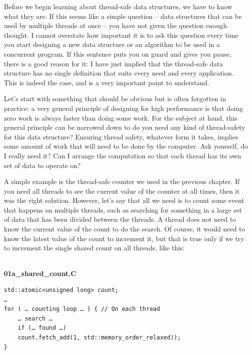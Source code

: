 
Before we begin learning about thread-safe data structures, we have to know what they are. If this seems like a simple question – data structures that can be used by multiple threads at once – you have not given the question enough thought. I cannot overstate how important it is to ask this question every time you start designing a new data structure or an algorithm to be used in a concurrent program. If this sentence puts you on guard and gives you pause, there is a good reason for it: I have just implied that the thread-safe data structure has no single definition that suits every need and every application. This is indeed the case, and is a very important point to understand.


Let's start with something that should be obvious but is often forgotten in practice: a very general principle of designing for high performance is that doing zero work is always faster than doing some work. For the subject at hand, this general principle can be narrowed down to do you need any kind of thread-safety for this data structure? Ensuring thread safety, whatever form it takes, implies some amount of work that will need to be done by the computer. Ask yourself, do I really need it? Can I arrange the computation so that each thread has its own set of data to operate on?

A simple example is the thread-safe counter we used in the previous chapter. If you need all threads to see the current value of the counter at all times, then it was the right solution. However, let's say that all we need is to count some event that happens on multiple threads, such as searching for something in a large set of data that has been divided between the threads. A thread does not need to know the current value of the count to do the search. Of course, it would need to know the latest value of the count to increment it, but that is true only if we try to increment the single shared count on all threads, like this:

\hspace*{\fill} \\ %
\noindent
\textbf{01a\_shared\_count.C}
\begin{lstlisting}[style=styleCXX]
std::atomic<unsigned long> count;
…
for ( … counting loop … ) { // On each thread
	… search …
	if (… found …)
	count.fetch_add(1, std::memory_order_relaxed));
}
\end{lstlisting}

